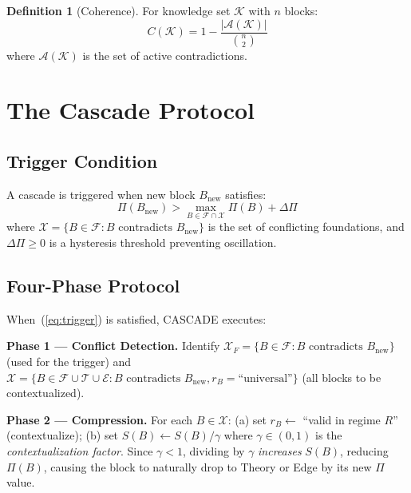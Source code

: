 \documentclass[11pt,a4paper]{article}
\theoremstyle{definition}
\newtheorem{definition}[theorem]{Definition}
\newcommand{\tp}{\Pi}
\begin{document}
\begin{definition}[Coherence]\label{def:coherence}
For knowledge set $\mathcal{K}$ with $n$ blocks:
\begin{equation}\label{eq:coherence}
C(\mathcal{K}) = 1 - \frac{|\mathcal{A}(\mathcal{K})|}{\binom{n}{2}}
\end{equation}
where $\mathcal{A}(\mathcal{K})$ is the set of active contradictions.
\end{definition}

\section{The Cascade Protocol}\label{sec:cascade}

\subsection{Trigger Condition}

A cascade is triggered when new block $B_{\text{new}}$ satisfies:
\begin{equation}\label{eq:trigger}
\tp(B_{\text{new}}) > \max_{B \in \mathcal{F} \cap \mathcal{X}} \tp(B) + \Delta\tp
\end{equation}
where $\mathcal{X} = \{B \in \mathcal{F} : B \text{ contradicts } B_{\text{new}}\}$ is
the set of conflicting foundations, and $\Delta\tp \geq 0$ is a hysteresis threshold
preventing oscillation.

\subsection{Four-Phase Protocol}

When~(\ref{eq:trigger}) is satisfied, CASCADE executes:

\textbf{Phase 1 --- Conflict Detection.} Identify $\mathcal{X}_F = \{B \in \mathcal{F}
: B \text{ contradicts } B_{\text{new}}\}$ (used for the trigger) and $\mathcal{X} =
\{B \in \mathcal{F} \cup \mathcal{T} \cup \mathcal{E} : B \text{ contradicts }
B_{\text{new}}, r_B = \text{``universal''}\}$ (all blocks to be contextualized).

\textbf{Phase 2 --- Compression.} For each $B \in \mathcal{X}$: (a) set $r_B
\leftarrow$ ``valid in regime $R$'' (contextualize); (b) set $S(B) \leftarrow S(B) /
\gamma$ where $\gamma \in (0,1)$ is the \emph{contextualization factor}. Since $\gamma
< 1$, dividing by $\gamma$ \emph{increases} $S(B)$, reducing $\tp(B)$, causing the
block to naturally drop to Theory or Edge by its new $\tp$ value.
\end{document}
